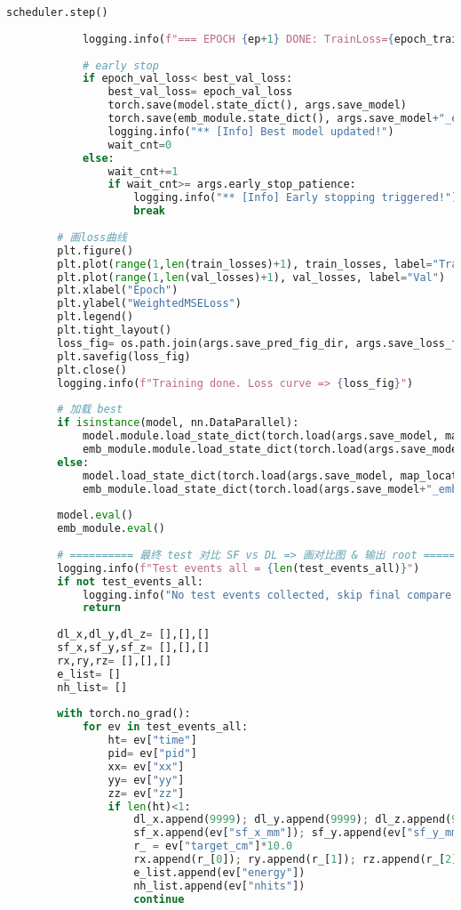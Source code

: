 \begin{lstlisting}[language=Python, caption={模型训练、验证与测试对比脚本 (train\_val\_test\_compare\_v1.py)}, label={lst:train_script}]
            scheduler.step()
    
            logging.info(f"=== EPOCH {ep+1} DONE: TrainLoss={epoch_train_loss:.4f}, ValLoss={epoch_val_loss:.4f}")
    
            # early stop
            if epoch_val_loss< best_val_loss:
                best_val_loss= epoch_val_loss
                torch.save(model.state_dict(), args.save_model)
                torch.save(emb_module.state_dict(), args.save_model+"_emb")
                logging.info("** [Info] Best model updated!")
                wait_cnt=0
            else:
                wait_cnt+=1
                if wait_cnt>= args.early_stop_patience:
                    logging.info("** [Info] Early stopping triggered!")
                    break
    
        # 画loss曲线
        plt.figure()
        plt.plot(range(1,len(train_losses)+1), train_losses, label="Train")
        plt.plot(range(1,len(val_losses)+1), val_losses, label="Val")
        plt.xlabel("Epoch")
        plt.ylabel("WeightedMSELoss")
        plt.legend()
        plt.tight_layout()
        loss_fig= os.path.join(args.save_pred_fig_dir, args.save_loss_fig)
        plt.savefig(loss_fig)
        plt.close()
        logging.info(f"Training done. Loss curve => {loss_fig}")
    
        # 加载 best
        if isinstance(model, nn.DataParallel):
            model.module.load_state_dict(torch.load(args.save_model, map_location=device))
            emb_module.module.load_state_dict(torch.load(args.save_model+"_emb", map_location=device))
        else:
            model.load_state_dict(torch.load(args.save_model, map_location=device))
            emb_module.load_state_dict(torch.load(args.save_model+"_emb", map_location=device))
    
        model.eval()
        emb_module.eval()
    
        # ========== 最终 test 对比 SF vs DL => 画对比图 & 输出 root ==========
        logging.info(f"Test events all = {len(test_events_all)}")
        if not test_events_all:
            logging.info("No test events collected, skip final compare.")
            return
    
        dl_x,dl_y,dl_z= [],[],[]
        sf_x,sf_y,sf_z= [],[],[]
        rx,ry,rz= [],[],[]
        e_list= []
        nh_list= []
    
        with torch.no_grad():
            for ev in test_events_all:
                ht= ev["time"]
                pid= ev["pid"]
                xx= ev["xx"]
                yy= ev["yy"]
                zz= ev["zz"]
                if len(ht)<1:
                    dl_x.append(9999); dl_y.append(9999); dl_z.append(9999)
                    sf_x.append(ev["sf_x_mm"]); sf_y.append(ev["sf_y_mm"]); sf_z.append(ev["sf_z_mm"])
                    r_ = ev["target_cm"]*10.0
                    rx.append(r_[0]); ry.append(r_[1]); rz.append(r_[2])
                    e_list.append(ev["energy"])
                    nh_list.append(ev["nhits"])
                    continue
    

\end{lstlisting}
